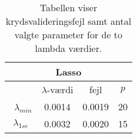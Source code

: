 \begin{table}
\center
\begin{tabular}{cccc}
\toprule
\multicolumn{4}{c}{Lasso} \\ \midrule
 & $\lambda$-værdi & fejl &$ p$ \\ \
 $\lambda_{min}$ & 0.0014 & 0.0019 & 20 \\ 
 $\lambda_{1se}$ & 0.0032 & 0.0020 & 15 \\ \bottomrule
\end{tabular}
\caption{Tabellen viser krydsvalideringsfejl samt antal valgte parameter for de to lambda værdier.  } \label{tab:cv_lasso}
\end{table}